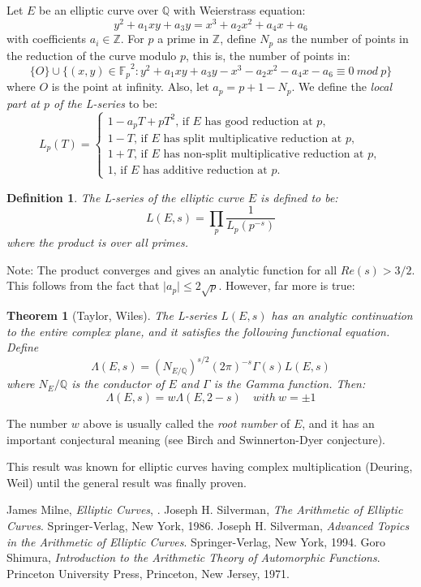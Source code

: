 \documentclass[12pt]{article}
\newtheorem*{thm}{Theorem}
\newtheorem*{defn}{Definition}
\begin{document}
Let $E$ be an elliptic curve over $\mathbb{Q}$ with Weierstrass
equation:
$$y^2+a_1xy+a_3y=x^3+a_2x^2+a_4x+a_6$$
with coefficients $a_i\in\mathbb{Z}$. For $p$ a prime in
$\mathbb{Z}$, define $N_p$ as the number of points in the
reduction of the curve modulo $p$, this is, the number of points in:
$$\{O\}\cup\{(x,y)\in{\mathbb{F}_p}^2\colon y^2+a_1xy+a_3y-x^3-a_2x^2-a_4x-a_6\equiv 0\ mod\ p\}$$
where $O$ is the point at infinity. Also, let $a_p=p+1-N_p$. We define the \emph{local part at $p$ of
the L-series} to be:
$$ L_p(T) = \begin{cases} 1-a_pT+pT^2  \text{, if $E$ has good reduction at $p$}, \\
 1-T  \text{, if $E$ has split multiplicative reduction at $p$},\\
 1+T  \text{, if $E$ has non-split multiplicative reduction at $p$},\\
 1  \text{, if $E$ has additive reduction at $p$}. \end{cases} $$

\begin{defn} The L-series of the elliptic curve $E$ is defined to
be:
$$ L(E,s) = \prod_{p}\frac{1}{L_p(p^{-s})} $$
where the product is over all primes.
\end{defn}

Note: The product converges and gives an analytic function for all
$Re(s)>3/2$. This follows from the fact that $\mid a_p \mid \leq
2\sqrt{p}$. However, far more is true:

\begin{thm}[Taylor, Wiles]
The L-series $L(E,s)$ has an analytic continuation to the entire
complex plane, and it satisfies  the following functional equation.
Define
$$\Lambda(E,s)=({N_{E/\mathbb{Q}}})^{s/2}(2\pi)^{-s}\Gamma(s)L(E,s)$$
where ${N_E/\mathbb{Q}}$ is the conductor of $E$ and $\Gamma$ is
the Gamma function. Then:
$$\Lambda(E,s)=w\Lambda(E,2-s)\quad with\ w=\pm 1$$
\end{thm}

The number $w$ above is usually called the \emph{root number} of
$E$, and it has an important conjectural meaning (see Birch and
Swinnerton-Dyer conjecture).

This result was known for elliptic curves having complex
multiplication (Deuring, Weil) until the general result was
finally proven.

\begin{thebibliography}{9}
 James Milne, {\em Elliptic Curves}, .
 Joseph H. Silverman, {\em The Arithmetic of Elliptic Curves}. Springer-Verlag, New York, 1986.
 Joseph H. Silverman, {\em Advanced Topics in
the Arithmetic of Elliptic Curves}. Springer-Verlag, New York,
1994.
 Goro Shimura, {\em Introduction to the
Arithmetic Theory of Automorphic Functions}. Princeton University
Press, Princeton, New Jersey, 1971.
\end{thebibliography}
\end{document}
